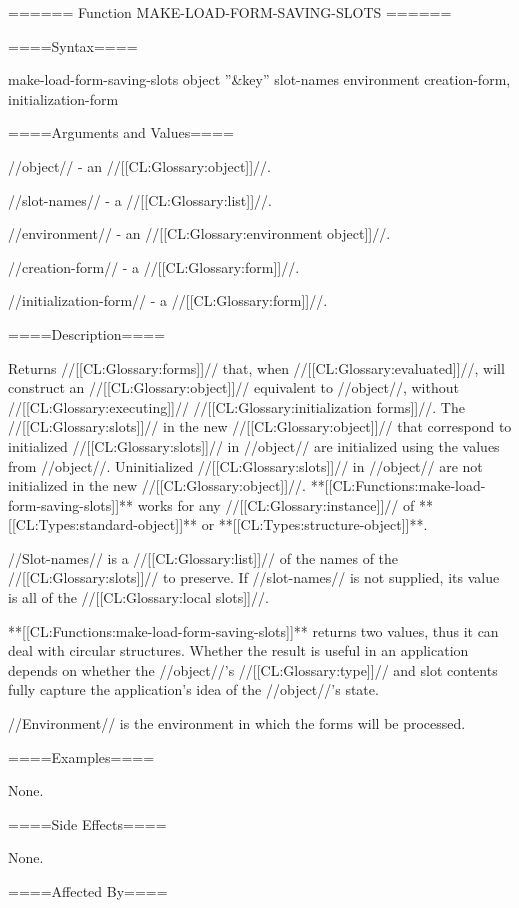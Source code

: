 ====== Function MAKE-LOAD-FORM-SAVING-SLOTS ======

====Syntax====

\DefunWithValuesNewline make-load-form-saving-slots {object ''&key'' slot-names environment} {creation-form, initialization-form}

====Arguments and Values====

//object// - an //[[CL:Glossary:object]]//.

//slot-names// - a //[[CL:Glossary:list]]//.

//environment// - an //[[CL:Glossary:environment object]]//.

//creation-form// - a //[[CL:Glossary:form]]//.

//initialization-form// - a //[[CL:Glossary:form]]//.

====Description====

Returns //[[CL:Glossary:forms]]// that, when //[[CL:Glossary:evaluated]]//, will construct an //[[CL:Glossary:object]]// equivalent to //object//, without //[[CL:Glossary:executing]]// //[[CL:Glossary:initialization forms]]//. The //[[CL:Glossary:slots]]// in the new //[[CL:Glossary:object]]// that correspond to initialized //[[CL:Glossary:slots]]// in //object// are initialized using the values from //object//. Uninitialized //[[CL:Glossary:slots]]// in //object// are not initialized in the new //[[CL:Glossary:object]]//. **[[CL:Functions:make-load-form-saving-slots]]** works for any //[[CL:Glossary:instance]]// of **[[CL:Types:standard-object]]** or **[[CL:Types:structure-object]]**.

//Slot-names// is a //[[CL:Glossary:list]]// of the names of the //[[CL:Glossary:slots]]// to preserve. If //slot-names// is not supplied, its value is all of the //[[CL:Glossary:local slots]]//.

**[[CL:Functions:make-load-form-saving-slots]]** returns two values, thus it can deal with circular structures. Whether the result is useful in an application depends on whether the //object//'s //[[CL:Glossary:type]]// and slot contents fully capture the application's idea of the //object//'s state.

//Environment// is the environment in which the forms will be processed.

====Examples====

None.

====Side Effects====

None.

====Affected By====

